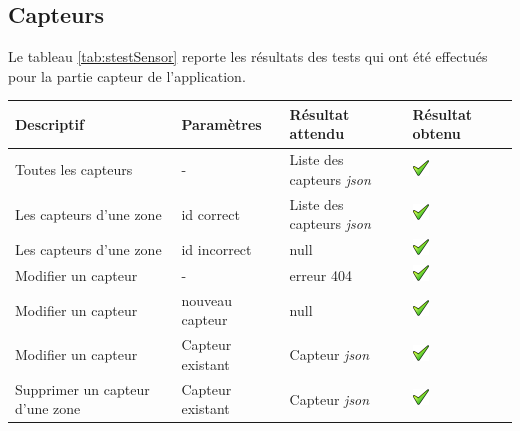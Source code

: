 \clearpage

\subsection{Capteurs} %
\label{sub:login}
Le tableau \ref{tab:stestSensor} reporte les résultats des tests qui ont été effectués pour la partie capteur de l'application.
\begin{table}[H]
\begin{tabularx}{\textwidth}{|X|X|X|X|}
  \hline
  \bf{Descriptif} & \bf{Paramètres} & \bf{Résultat attendu} & \bf{Résultat obtenu}\\
  \hline
  Toutes les capteurs & - & Liste des capteurs \emph{\gls{json}} & \includegraphics[width=16px]{00_media/ok.png} \\
  \hline
  Les capteurs d'une zone & id correct & Liste des capteurs \emph{\gls{json}} & \includegraphics[width=16px]{00_media/ok.png} \\
  \hline
  Les capteurs d'une zone & id incorrect & null & \includegraphics[width=16px]{00_media/ok.png} \\
  \hline
  Modifier un capteur & - & erreur 404 & \includegraphics[width=16px]{00_media/ok.png} \\
  \hline
  Modifier un capteur & nouveau capteur & null & \includegraphics[width=16px]{00_media/ok.png} \\
  \hline
  Modifier un capteur & Capteur existant & Capteur \emph{\gls{json}} & \includegraphics[width=16px]{00_media/ok.png} \\
  \hline
  Supprimer un capteur d'une zone & Capteur existant & Capteur \emph{\gls{json}} & \includegraphics[width=16px]{00_media/ok.png} \\

\end{tabularx}
\end{table}
